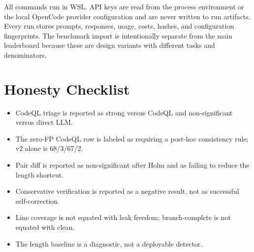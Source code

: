 \documentclass[conference]{IEEEtran}
\begin{document}
All commands run in WSL. API keys are read from the process environment or the local OpenCode provider configuration and are never written to run artifacts. Every run stores prompts, responses, usage, costs, hashes, and configuration fingerprints. The benchmark import is intentionally separate from the main leaderboard because these are design variants with different tasks and denominators.

\section{Honesty Checklist}
\begin{itemize}
  \item CodeQL triage is reported as strong versus CodeQL and non-significant versus direct LLM.
  \item The zero-FP CodeQL row is labeled as requiring a post-hoc consistency rule; v2 alone is 68/3/67/2.
  \item Pair diff is reported as non-significant after Holm and as failing to reduce the length shortcut.
  \item Conservative verification is reported as a negative result, not as successful self-correction.
  \item Line coverage is not equated with leak freedom; branch-complete is not equated with clean.
  \item The length baseline is a diagnostic, not a deployable detector.
\end{itemize}
\end{document}
